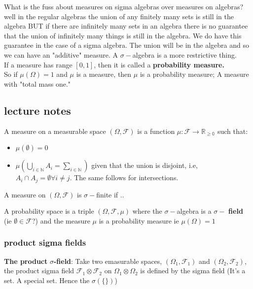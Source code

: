 \documentclass{article}
\begin{document}
What is the fuss about measures on sigma algebras over measures on algebras? well in the regular algebras the union of any finitely many sets is still in the algebra BUT if there are infinitely many sets in an algebra there is no guarantee that the union of infinitely many things is still in the algebra. We do have this guarantee in the case of a sigma algebra. The union will be in the algebra and so we can have an "additive" measure. A $\sigma-$algebra is a more restrictive thing.  \\

If a measure has range $[0,1]$, then it is called a \textbf{probability measure.} \\ 

So if $\mu(\Omega) = 1$ and $\mu$ is a measure, then $\mu$ is a probability measure; A measure with "total mass one." \\


\subsection{lecture notes}
A measure on a measurable space $(\Omega, \mathcal{F})$ is a function $\mu : \mathcal{F} \rightarrow \mathbb{R_{\geq 0}}$ such that: 
\begin{itemize}
\item $\mu(\emptyset) = 0$
\item $\mu(\bigcup_{i\in \mathbb{N}} A_i = \sum_{i \in \mathbb{N}})$ given that the union is disjoint, i.e, $A_i \cap A_j = \emptyset \forall i \neq j$. The same follows for intersections.
\end{itemize}

A measure on $(\Omega, \mathcal{F})$ is $\sigma-$finite if ..

A probability space is a triple $(\Omega, \mathcal{F}, \mu)$ where the $\sigma-$algebra is a $\sigma-$ \textbf{field} (ie $\emptyset \in \mathcal{F}$?) and the measure $\mu$ is a probability measure ie $\mu(\Omega) = 1$ \\

\subsubsection{product sigma fields}
\textbf{The product} $\sigma$\textbf{-field}: Take two emasurable spaces, $(\Omega_1, \mathcal{F}_1)$ and $(\Omega_2, \mathcal{F}_2)$, the product sigma field $\mathcal{F}_1 \otimes \mathcal{F}_2$ on $\Omega_1 \otimes \Omega_2$ is defined by the sigma field (It's a set. A special set. Hence the $\sigma(\{\})$)
\end{document}
